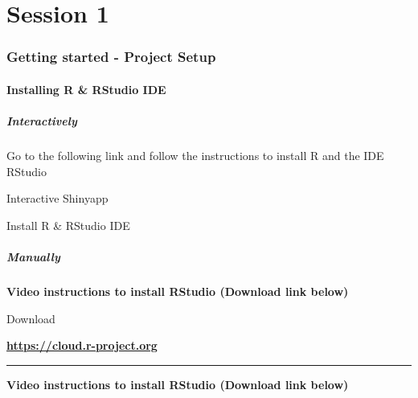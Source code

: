 \documentclass[]{article}
\author{}
\date{\vspace{-2.5em}}
\newenvironment{rmdattachment}
  {\begin{center}}
  {\end{center}}
\newenvironment{rmdblankbox}
  {\begin{center}}
  {\end{center}}
\begin{document}
{
\setcounter{tocdepth}{2}
\tableofcontents
}
\hypertarget{part-session-1}{%
\part{Session 1}\label{part-session-1}}

\hypertarget{session_01_01}{%
\section{Getting started - Project Setup}\label{session_01_01}}

\hypertarget{installing-r-rstudio-ide}{%
\subsection{ Installing R \& RStudio IDE}\label{installing-r-rstudio-ide}}

\hypertarget{interactively}{%
\subsubsection{Interactively}\label{interactively}}

Go to the following link and follow the instructions to install R and the IDE RStudio

\begin{rmdblankbox}
Interactive Shinyapp
\end{rmdblankbox}
\begin{rmdshiny}
Install R \& RStudio IDE
\end{rmdshiny}

\hypertarget{manually}{%
\subsubsection{Manually}\label{manually}}

\textbf{Video instructions to install RStudio (Download link below)}

\begin{rmdblankbox}
Download
\end{rmdblankbox}
\begin{rmdattachment}
\textbf{\url{https://cloud.r-project.org}}
\end{rmdattachment}

\begin{center}\rule{0.5\linewidth}{0.5pt}\end{center}

\textbf{Video instructions to install RStudio (Download link below)}
\end{document}
